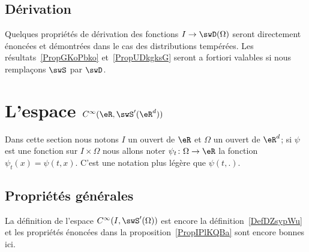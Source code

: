\subsection{Dérivation}

Quelques propriétés de dérivation des fonctions \( I\to \swD(\Omega)\) seront directement énoncées et démontrées dans le cas des distributions tempérées. Les résultats~\ref{PropGKoPbko} et~\ref{PropUDkgksG} seront a fortiori valables si nous remplaçons \( \swS\) par \( \swD\).

\section{L'espace \texorpdfstring{$  C^{\infty}(\eR,\swS'(\eR^d))$}{C(R,S')}}

Dans cette section nous notons \( I\) un ouvert de \( \eR\) et \( \Omega\) un ouvert de \( \eR^d\); si \( \psi\) est une fonction sur \( I\times \Omega\) nous allons noter \( \psi_t\colon \Omega\to \eR\) la fonction \( \psi_t(x)=\psi(t,x)\). C'est une notation plus légère que \( \psi(t,.)\).

\subsection{Propriétés générales}

La définition de l'espace \(  C^{\infty}(I,\swS'(\Omega))\) est encore la définition~\ref{DefDZsypWu} et les propriétés énoncées dans la proposition~\ref{PropIPlKQBa} sont encore bonnes ici.

